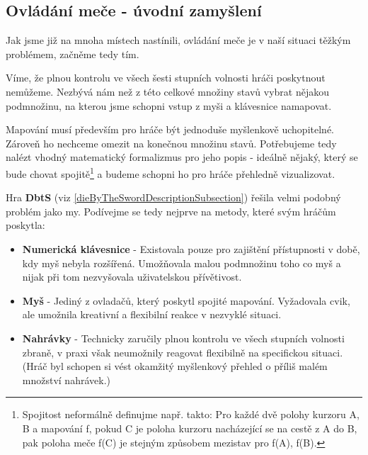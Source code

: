 \subsection{Ovládání meče - úvodní zamyšlení}

Jak jsme již na mnoha místech nastínili, ovládání meče je v naší situaci těžkým problémem, začněme tedy tím. 

Víme, že plnou kontrolu ve všech šesti stupních volnosti hráči poskytnout nemůžeme. Nezbývá nám než z této celkové množiny stavů vybrat nějakou podmnožinu, na kterou jsme schopni vstup z myši a klávesnice namapovat.

Mapování musí především pro hráče být jednoduše myšlenkově uchopitelné. Zároveň ho nechceme omezit na konečnou množinu stavů. Potřebujeme tedy nalézt vhodný matematický formalizmus pro jeho popis - ideálně nějaký, který se bude chovat spojitě\footnote{Spojitost neformálně definujme např. takto: Pro každé dvě polohy kurzoru A, B a mapování f, pokud C je poloha kurzoru nacházející se na cestě z A do B, pak poloha meče f(C) je stejným způsobem mezistav pro f(A), f(B).} a budeme schopni ho pro hráče přehledně vizualizovat.

Hra \textbf{\acl{DbtS}} (viz \ref{dieByTheSwordDescriptionSubsection}) řešila velmi podobný problém jako my. Podívejme se tedy nejprve na metody, které svým hráčům poskytla:
\begin{itemize}
    \item \textbf{Numerická klávesnice} - Existovala pouze pro zajištění přístupnosti v době, kdy myš nebyla rozšířená. Umožňovala malou podmnožinu toho co myš a nijak při tom nezvyšovala uživatelskou přívětivost.
    \item \textbf{Myš} - Jediný z ovladačů, který poskytl spojité mapování. Vyžadovala cvik, ale umožnila kreativní a flexibilní reakce v nezvyklé situaci.
    \item \textbf{Nahrávky} - Technicky zaručily plnou kontrolu ve všech stupních volnosti zbraně, v praxi však neumožnily reagovat flexibilně na specifickou situaci. (Hráč byl schopen si vést okamžitý myšlenkový přehled o příliš malém množství nahrávek.)
\end{itemize}


